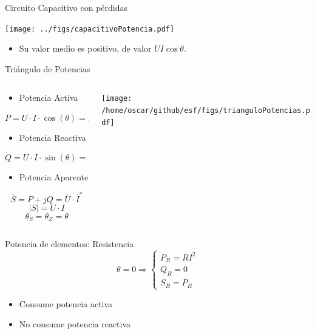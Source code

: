 \documentclass[xcolor={usenames,svgnames,dvipsnames}]{beamer}
\begin{document}
\begin{frame}[label={sec:orgecd736a}]{Circuito Capacitivo con pérdidas}
\begin{center}
\texttt{[image: ../figs/capacitivoPotencia.pdf]}
\end{center}

\begin{itemize}
\item Su valor medio es positivo, de valor \(U I \cos \theta\).
\end{itemize}
\end{frame}

\begin{frame}[label={sec:orgd09e06e}]{Triángulo de Potencias}
\begin{columns}
\begin{column}{0.4\columnwidth}
\begin{itemize}
\item Potencia Activa
\end{itemize}
\[  
\boxed{P = U\cdot I\cdot\cos(\theta) = R \cdot I^2}
\]

\begin{itemize}
\item Potencia Reactiva
\end{itemize}
\[
\boxed{Q = U\cdot I\cdot\sin(\theta) = X \cdot I^2}
\]

\begin{itemize}
\item Potencia Aparente
\end{itemize}
\[
\boxed{\overline{S} = P + jQ = \overline{U} \cdot \overline{I}^*}
\]
\[
|S| = U \cdot I
\]
\[
\theta_S = \theta_Z = \theta
\]
\end{column}

\begin{column}{0.6\columnwidth}
\begin{center}
\texttt{[image: /home/oscar/github/esf/figs/trianguloPotencias.pdf]}
\end{center}
\end{column}
\end{columns}
\end{frame}

\begin{frame}[label={sec:orgd35b959}]{Potencia de elementos: Resistencia}
\[
\theta = 0 \Rightarrow 
\begin{cases}
  P_R = R I^2\\
  Q_R = 0\\
  S_R = P_R
\end{cases}
\]

\begin{itemize}
\item Consume potencia activa
\item No consume potencia reactiva
\end{itemize}
\end{frame}
\end{document}
